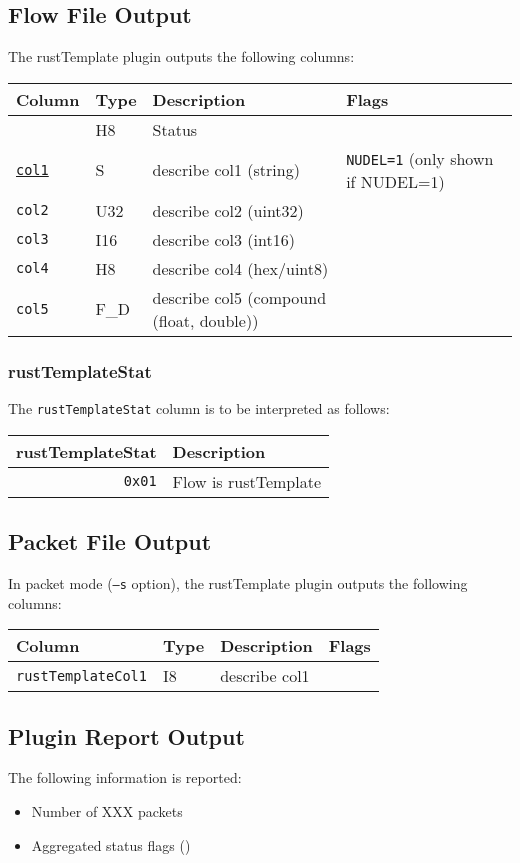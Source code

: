 \documentclass[documentation]{subfiles}
\begin{document}
\subsection{Flow File Output}
The rustTemplate plugin outputs the following columns:
\begin{longtable}{llll}
    {\bf Column} & {\bf Type} & {\bf Description} & {\bf Flags}\\
    \hline\endhead
    {\tt \nameref{rustTemplateStat}} & H8 & Status & \\
    {\tt \hyperref[rustTemplateStat]{col1}} & S & describe col1 (string) & {\tt NUDEL=1} (only shown if NUDEL=1)\\
    {\tt col2} & U32 & describe col2 (uint32) & \\
    {\tt col3} & I16 & describe col3 (int16) & \\
    {\tt col4} & H8 & describe col4 (hex/uint8) & \\
    {\tt col5} & F\_D & describe col5 (compound (float, double)) & \\
\end{longtable}

\subsubsection{rustTemplateStat}\label{rustTemplateStat}
The {\tt rustTemplateStat} column is to be interpreted as follows:
\begin{longtable}{rl}
    {\bf rustTemplateStat} & {\bf Description}\\
    \hline\endhead
    {\tt 0x01} & Flow is rustTemplate\\
\end{longtable}

\subsection{Packet File Output}
In packet mode ({\tt --s} option), the rustTemplate plugin outputs the following columns:
\begin{longtable}{llll}
    {\bf Column} & {\bf Type} & {\bf Description} & {\bf Flags}\\
    \hline\endhead
    {\tt rustTemplateCol1} & I8 & describe col1 & \\
\end{longtable}
 
\subsection{Plugin Report Output}
The following information is reported:
\begin{itemize}
    \item Number of XXX packets
    \item Aggregated status flags ({\tt{}})
\end{itemize}
\end{document}
